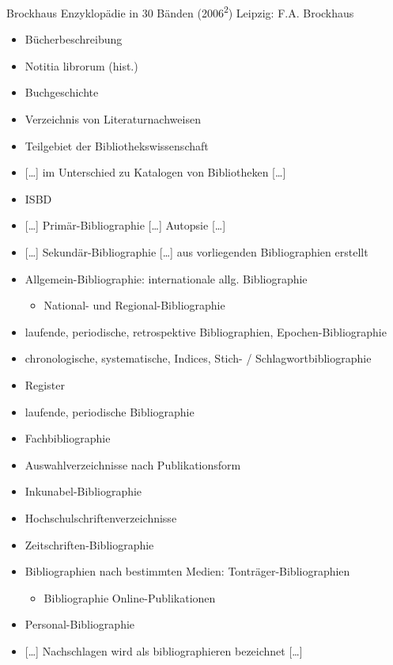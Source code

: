 \documentclass[a4paper,
fontsize=11pt,
oneside,
numbers=noperiodatend,
parskip=half-,
bibliography=totoc,
final
]{scrartcl}
\providecommand{\tightlist}{%
  \setlength{\itemsep}{0pt}\setlength{\parskip}{0pt}}
\begin{document}
Brockhaus Enzyklopädie in 30 Bänden (2006\textsuperscript{2}) Leipzig:
F.A. Brockhaus

\begin{itemize}
\item
  Bücherbeschreibung
\item
  Notitia librorum (hist.)
\item
  Buchgeschichte
\item
  Verzeichnis von Literaturnachweisen
\item
  Teilgebiet der Bibliothekswissenschaft
\item
  {[}\ldots{}{]} im Unterschied zu Katalogen von Bibliotheken
  {[}\ldots{}{]}
\item
  ISBD
\item
  {[}\ldots{}{]} Primär-Bibliographie {[}\ldots{}{]} Autopsie
  {[}\ldots{}{]}
\item
  {[}\ldots{}{]} Sekundär-Bibliographie {[}\ldots{}{]} aus vorliegenden
  Bibliographien erstellt
\item
  Allgemein-Bibliographie: internationale allg. Bibliographie

  \begin{itemize}
  \tightlist
  \item
    National- und Regional-Bibliographie
  \end{itemize}
\item
  laufende, periodische, retrospektive Bibliographien,
  Epochen-Bibliographie
\item
  chronologische, systematische, Indices, Stich- /
  Schlagwortbibliographie
\item
  Register
\item
  laufende, periodische Bibliographie
\item
  Fachbibliographie
\item
  Auswahlverzeichnisse nach Publikationsform
\item
  Inkunabel-Bibliographie
\item
  Hochschulschriftenverzeichnisse
\item
  Zeitschriften-Bibliographie
\item
  Bibliographien nach bestimmten Medien: Tonträger-Bibliographien

  \begin{itemize}
  \tightlist
  \item
    Bibliographie Online-Publikationen
  \end{itemize}
\item
  Personal-Bibliographie
\item
  {[}\ldots{}{]} Nachschlagen wird als bibliographieren bezeichnet
  {[}\ldots{}{]}
\end{itemize}
\end{document}

